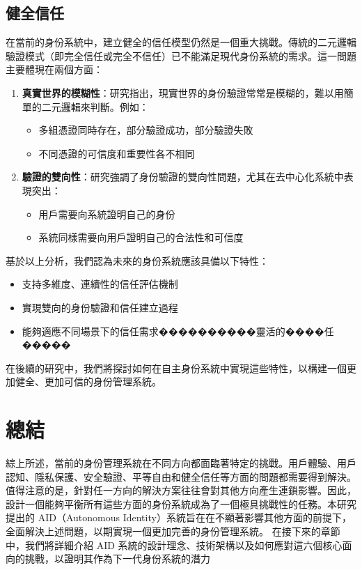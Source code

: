 \subsection{健全信任}
在當前的身份系統中，建立健全的信任模型仍然是一個重大挑戰。傳統的二元邏輯驗證模式（即完全信任或完全不信任）已不能滿足現代身份系統的需求。這一問題主要體現在兩個方面：
\begin{enumerate}
  \item \textbf{真實世界的模糊性}：研究\cite{s22155641}指出，現實世界的身份驗證常常是模糊的，難以用簡單的二元邏輯來判斷。例如：
        \begin{itemize}
          \item 多組憑證同時存在，部分驗證成功，部分驗證失敗
          \item 不同憑證的可信度和重要性各不相同
        \end{itemize}
  \item \textbf{驗證的雙向性}：研究\cite{4489846}強調了身份驗證的雙向性問題，尤其在去中心化系統中表現突出：
        \begin{itemize}
          \item 用戶需要向系統證明自己的身份
          \item 系統同樣需要向用戶證明自己的合法性和可信度
        \end{itemize}
\end{enumerate}
基於以上分析，我們認為未來的身份系統應該具備以下特性：
\begin{itemize}
  \item 支持多維度、連續性的信任評估機制
  \item 實現雙向的身份驗證和信任建立過程
  \item 能夠適應不同場景下的信任需求����������靈活的����任�����
\end{itemize}
在後續的研究中，我們將探討如何在自主身份系統中實現這些特性，以構建一個更加健全、更加可信的身份管理系統。
\section{總結}
綜上所述，當前的身份管理系統在不同方向都面臨著特定的挑戰。用戶體驗、用戶認知、隱私保護、安全驗證、平等自由和健全信任等方面的問題都需要得到解決。\newline
值得注意的是，針對任一方向的解決方案往往會對其他方向產生連鎖影響。因此，設計一個能夠平衡所有這些方面的身份系統成為了一個極具挑戰性的任務。本研究提出的 AID（Autonomous Identity）系統旨在在不顯著影響其他方面的前提下，全面解決上述問題，以期實現一個更加完善的身份管理系統。\newline
在接下來的章節中，我們將詳細介紹 AID 系統的設計理念、技術架構以及如何應對這六個核心面向的挑戰，以證明其作為下一代身份系統的潛力